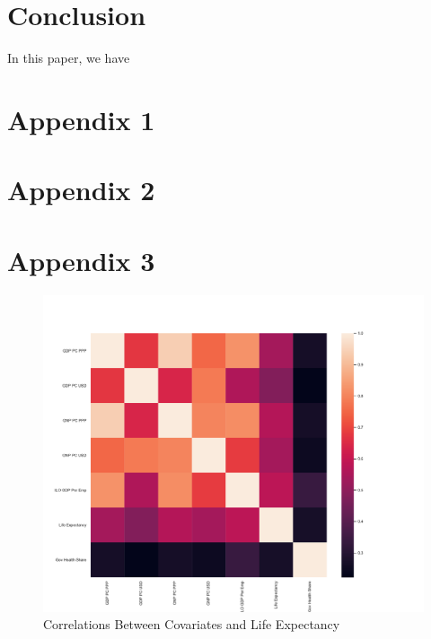 \documentclass[10pt]{article}
\begin{document}
        

    \section*{Conclusion}
        
In this paper, we have 

    \clearpage \newpage

    
    

    \clearpage \newpage

    \appendix

    \section*{Appendix 1}

        
        
        
        
    \section*{Appendix 2}


         
        
        


    \section*{Appendix 3}

        \begin{figure}[h!]
            \centering
            \caption{Correlations Between Covariates and Life Expectancy}
            \label{LE_Health_Econ_Correlations}	
            \includegraphics[width=\linewidth,keepaspectratio=true]{../Output/Figures/LE_Health_Econ_Correlations_combined_short.pdf}
        \end{figure}
\end{document}
